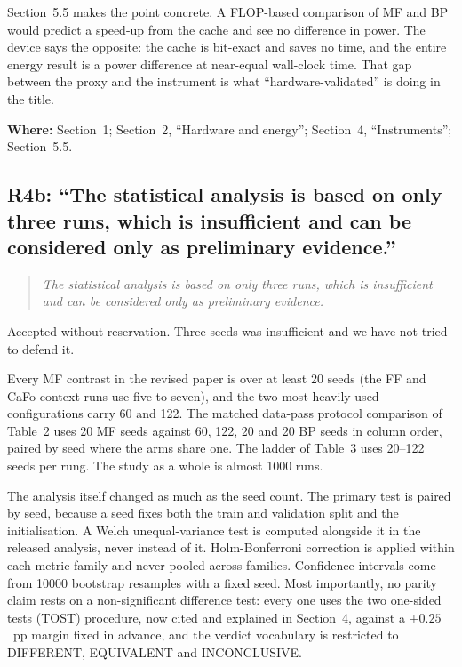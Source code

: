 \documentclass[11pt,a4paper]{article}
\newcommand{\FF}{FF}
\newcommand{\MF}{MF}
\newcommand{\BP}{BP}
\newcommand{\CaFo}{CaFo}
\newenvironment{comment}%
  {\begin{quote}\itshape\small}%
  {\end{quote}}
\newcommand{\where}[1]{\par\smallskip\noindent\textbf{Where:} #1\par}
\begin{document}
Section~5.5 makes the point concrete. A FLOP-based comparison of \MF{} and
\BP{} would predict a speed-up from the cache and see no difference in power.
The device says the opposite: the cache is bit-exact and saves no time, and the
entire energy result is a power difference at near-equal wall-clock time. That gap
between the proxy and the instrument is what ``hardware-validated'' is doing
in the title.

\where{Section~1; Section~2, ``Hardware and energy''; Section~4,
``Instruments''; Section~5.5.}

\subsection*{R4b: ``The statistical analysis is based on only three runs,
which is insufficient and can be considered only as preliminary evidence.''}

\begin{comment}
The statistical analysis is based on only three runs, which is insufficient and
can be considered only as preliminary evidence.
\end{comment}

\noindent
Accepted without reservation. Three seeds was insufficient and we have not
tried to defend it.

Every \MF{} contrast in the revised paper is over at least \num{20} seeds (the
\FF{} and \CaFo{} context runs use five to seven), and the
two most heavily used configurations carry \num{60} and \num{122}. The
matched data-pass protocol comparison of Table~2 uses \num{20} \MF{} seeds against
\num{60}, \num{122}, \num{20} and \num{20} \BP{} seeds in column order, paired by seed where
the arms share one. The ladder of Table~3 uses \numrange{20}{122} seeds per
rung. The study as a whole is almost \num{1000} runs.

The analysis itself changed as much as the seed count. The primary test is
paired by seed, because a seed fixes both the train and validation split and
the initialisation. A Welch unequal-variance test is computed alongside it in the released
analysis, never instead of it. Holm-Bonferroni correction is applied within each metric
family and never pooled across families. Confidence intervals come from
\num{10000} bootstrap resamples with a fixed seed. Most importantly, no parity
claim rests on a non-significant difference test: every one uses the two
one-sided tests (TOST) procedure, now cited and explained in Section~4, against
a $\pm\num{0.25}$~pp margin fixed in advance, and the
verdict vocabulary is restricted to DIFFERENT, EQUIVALENT and INCONCLUSIVE.
\end{document}
